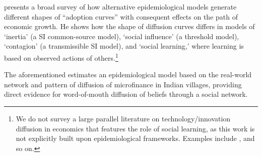 \href{https://github.com/iworld1991/EpiExp/blob/master/Literature/young2009innovation.pdf}{\cite{young2009innovation}} presents a broad survey of how alternative epidemiological models generate different shapes of  ``adoption curves'' with consequent effects on the path of economic growth. He shows how the shape of diffusion curves differs in models of `inertia' (a SI common-source model), `social influence' (a threshold model), `contagion' (a transmissible SI model), and `social learning,' where learning is based on observed actions of others.\footnote{We do not survey a large parallel literature on technology/innovation diffusion in economics that features the role of social learning, as this work is not explicitly built upon epidemiological frameworks. Examples include  \href{https://www.researchgate.net/publication/222676428_Social_Learning_in_a_Heterogeneous_Population_Technology_Diffusion_in_the_Indian_Green_Revolution}{\cite{munshi2004social}},   \href{https://www.jstor.org/stable/41038754}{\cite{comin2010exploration}} and so on.}  %


The aforementioned  \href{https://pubmed.ncbi.nlm.nih.gov/23888042/}{\cite{banerjee2013diffusion}} estimates an epidemiological model based on the real-world network and pattern of  diffusion of microfinance in Indian villages, providing direct evidence for word-of-mouth diffusion of beliefs through a social network. %

